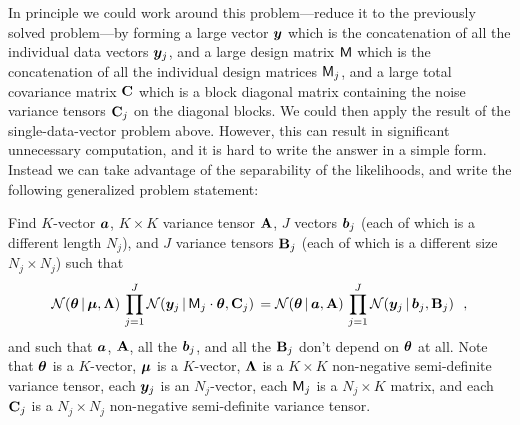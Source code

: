 In principle we could work around this problem---reduce it to the previously solved problem---by forming a large vector $\boldsymbol{y}$ which is the concatenation of all the individual data vectors $\boldsymbol{y}_j$, and a large design matrix $\mathsf{M}$ which is the concatenation of all the individual design matrices $\mathsf{M}_j$, and a large total covariance matrix $\mathbf{C}$ which is a block diagonal matrix containing the noise variance tensors $\mathbf{C}_j$ on the diagonal blocks.
We could then apply the result of the single-data-vector problem above.
However, this can result in significant unnecessary computation, and it is hard to write the answer in a simple form.
Instead we can take advantage of the separability of the likelihoods, and write the following generalized problem statement:

Find $K$-vector $\boldsymbol{a}$, $K\times K$ variance tensor $\mathbf{A}$, $J$ vectors $\boldsymbol{b}_j$ (each
of which is a different length $N_j$),
and $J$ variance tensors $\mathbf{B}_j$ (each of which is a different size $N_j\times N_j$)
such that
\begin{equation}\label{eq:genproblem}
\mathcal{N}\!\,(\boldsymbol{\theta}\,|\,\boldsymbol{\mu},\mathbf{\Lambda})\,\prod_{j=1}^J\mathcal{N}\!\,(\boldsymbol{y}_j\,|\,\mathsf{M}_j\cdot\boldsymbol{\theta},\mathbf{C}_j)\,
 = \mathcal{N}\!\,(\boldsymbol{\theta}\,|\,\boldsymbol{a},\mathbf{A})\,\prod_{j=1}^J\mathcal{N}\!\,(\boldsymbol{y}_j\,|\,\boldsymbol{b}_j,\mathbf{B}_j) ~~,
\end{equation}
and such that $\boldsymbol{a}$, $\mathbf{A}$, all the $\boldsymbol{b}_j$, and all the $\mathbf{B}_j$
don't depend on $\boldsymbol{\theta}$ at all.
Note that
$\boldsymbol{\theta}$ is a $K$-vector,
$\boldsymbol{\mu}$ is a $K$-vector,
$\mathbf{\Lambda}$ is a $K\times K$ non-negative semi-definite variance tensor,
each $\boldsymbol{y}_j$ is an $N_j$-vector,
each $\mathsf{M}_j$ is a $N_j\times K$ matrix,
and
each $\mathbf{C}_j$ is a $N_j\times N_j$ non-negative semi-definite variance tensor.

